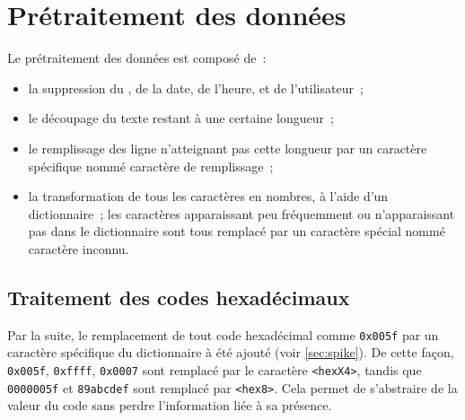 \section{Prétraitement des données}\label{def_dict_papud}
Le prétraitement des données est composé de~:
\begin{itemize}
	\item la suppression du , de la date, de l'heure, et de l'utilisateur~;
	\item le découpage du texte restant à une certaine longueur~;
	\item le remplissage des ligne n'atteignant pas cette longueur par un caractère spécifique nommé caractère de remplissage~;
	\item la transformation de tous les caractères en nombres, à l'aide d'un dictionnaire~; les caractères apparaissant peu fréquemment ou n'apparaissant pas dans le dictionnaire sont tous remplacé par un caractère spécial nommé \og caractère inconnu\fg{}.
\end{itemize}

\subsection{Traitement des codes hexadécimaux}\label{hex}
Par la suite, le remplacement de tout code hexadécimal comme \lstinline|0x005f| par un caractère spécifique du dictionnaire à été ajouté (voir \autoref{sec:spike}).
De cette façon, \lstinline|0x005f|, \lstinline|0xffff|, \lstinline|0x0007| sont remplacé par le caractère  \lstinline|<hexX4>|, tandis que  \lstinline|0000005f| et  \lstinline|89abcdef| sont remplacé par  \lstinline|<hex8>|.
Cela permet de s'abstraire de la valeur du code sans perdre l'information liée à sa présence.


